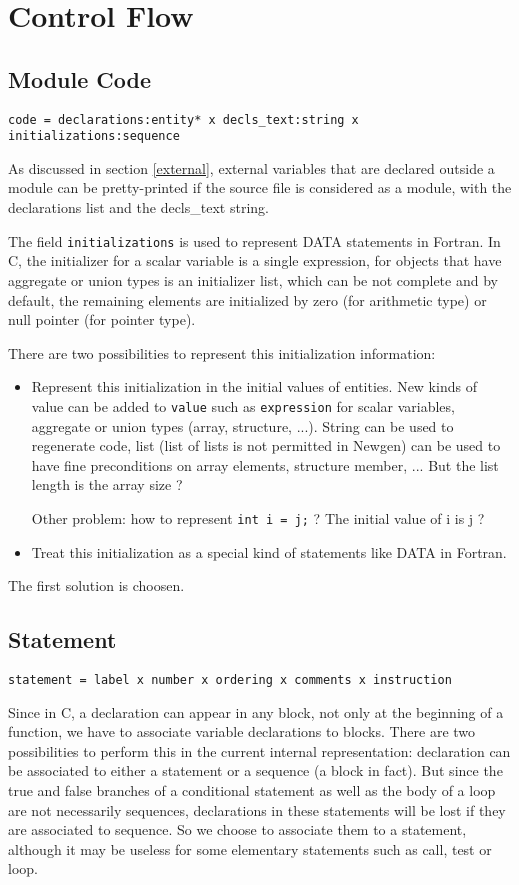 \documentclass[a4paper]{article}
\begin{document}
\newpage
\section{Control Flow}
\subsection{Module Code}
\verb/code = declarations:entity* x decls_text:string x initializations:sequence/

As discussed in section \ref{external}, external variables that are
declared outside a module can be pretty-printed if the source file is
considered as a module, with the declarations list and the decls\_text string. 

The field \verb/initializations/ is used to represent DATA statements in
Fortran. 
In C, the initializer for a scalar variable is a single expression, for
objects that have aggregate or union types is an initializer list, which
can be not complete and by default, the remaining elements are initialized by zero (for
arithmetic type) or null pointer (for pointer type).

There are two possibilities to represent this initialization information:
\begin{itemize}
\item Represent this initialization in the initial values of
entities. New kinds of value can be added to \verb/value/ such as
\verb/expression/ for scalar variables, 
aggregate or union types (array, structure, ...). String can be used to
  regenerate code, list (list of lists is not permitted in Newgen) can be used  to
  have fine preconditions on array elements, structure member, ... But the
  list length is the array size ?

Other problem: how to represent \verb/int i = j;/ ? The initial value of i
is j ?
\item Treat this initialization as a special kind of statements like DATA
  in Fortran. 
\end{itemize}
The first solution is choosen. 
\subsection{Statement}
\label{statement}
 
\verb/statement = label x number x ordering x comments x instruction/

Since in C, a declaration can appear in any block, not only at the
beginning of a function, we have to associate variable declarations
to blocks. There are two possibilities to perform this in the current internal representation: declaration can be associated to
either a statement or a sequence (a block in fact). But since the true and false branches of a
conditional statement as well as the body of a loop are not necessarily
sequences, declarations in these statements will be lost if
they are associated to sequence. So we choose to associate them to
a statement, although it may be useless for some elementary statements such
as call, test or loop. 
\end{document}
